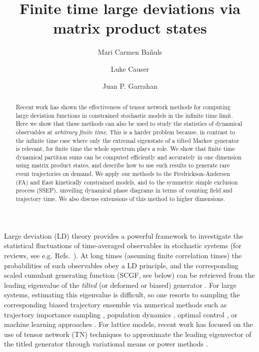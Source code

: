 \documentclass[prl,showpacs,superscriptaddress,twocolumn,longbibliography]{revtex4-1}
\begin{document}
  

\title{Finite time large deviations via matrix product states}

\author{Mari Carmen Ba\~nuls}
\author{Luke Causer}
\author{Juan P. Garrahan}



\begin{abstract}
Recent work has shown the effectiveness of tensor network methods for computing large deviation functions in constrained stochastic models in the infinite time limit. 
Here we show that these methods can also be used to study the statistics of dynamical observables at {\em arbitrary finite time}. This is a harder problem because, in contrast to the infinite time case where only the extremal eigenstate of a tilted Markov generator is relevant, for finite time the whole spectrum plays a role. We show that finite time dynamical partition sums can be computed efficiently and accurately in one dimension using matrix product states, and describe how to use such results to generate rare event trajectories on demand. We apply our methods to the Fredrickson-Andersen (FA) and East kinetically constrained models, and to the symmetric simple exclusion process (SSEP), unveiling dynamical phase diagrams in terms of counting field and trajectory time. We also discuss extensions of this method to higher dimensions. 
\end{abstract}




\maketitle

Large deviation (LD) theory provides a powerful framework to investigate the statistical fluctuations of time-averaged observables in stochastic systems (for reviews, see e.g. Refs.~\cite{Touchette2009, Garrahan2018, Jack2020, Limmer2021}).
At long times (assuming finite correlation times)   
the probabilities of such observables obey a LD principle, and the corresponding scaled cumulant generating function (SCGF, see below) can be retrieved from the leading eigenvalue of the \emph{tilted} (or deformed or biased) generator \cite{Touchette2009}.
For large systems, estimating this eigenvalue is difficult, so one resorts to sampling the corresponding biased trajectory ensemble via numerical methods such as trajectory importance sampling \cite{Bolhuis2002, Ray2018, Klymko2018, Guyader2020}, population dynamics \cite{Borkar2003, Giardina2006, Lecomte2007b}, optimal control \cite{Jack2010, Nemoto2016, Ferre2018, Ray2018b, Jacobson2019, Das2019, Ray2020}, or machine learning approaches \cite{Oakes2020, Rose2021, Casert2020, Whitelam2020, Das2021, Yan2021}. For lattice models, recent work has focused on the use of tensor network (TN) techniques to approximate the leading eigenvector of the titled generator through variational means \cite{Banuls2019, Helms2019, Causer2020} or power methods \cite{Helms2020}.
\end{document}
